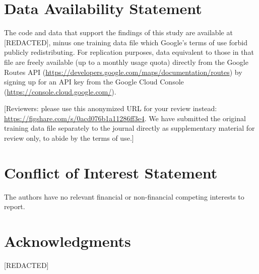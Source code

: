 \documentclass[12pt,letterpaper]{article} %
\begin{document}
\section*{Data Availability Statement}

The code and data that support the findings of this study are available at [REDACTED], minus one training data file which Google's terms of use forbid publicly redistributing. For replication purposes, data equivalent to those in that file are freely available (up to a monthly usage quota) directly from the Google Routes API (\url{https://developers.google.com/maps/documentation/routes}) by signing up for an API key from the Google Cloud Console (\url{https://console.cloud.google.com/}).

[Reviewers: please use this anonymized URL for your review instead: \url{https://figshare.com/s/0acd076b1a11286ff3e4}. We have submitted the original training data file separately to the journal directly as supplementary material for review only, to abide by the terms of use.]

\section*{Conflict of Interest Statement}

The authors have no relevant financial or non-financial competing interests to report.

\section*{Acknowledgments}

[REDACTED]


\setlength{\bibsep}{0.00cm plus 0.05cm} %


\end{document}
